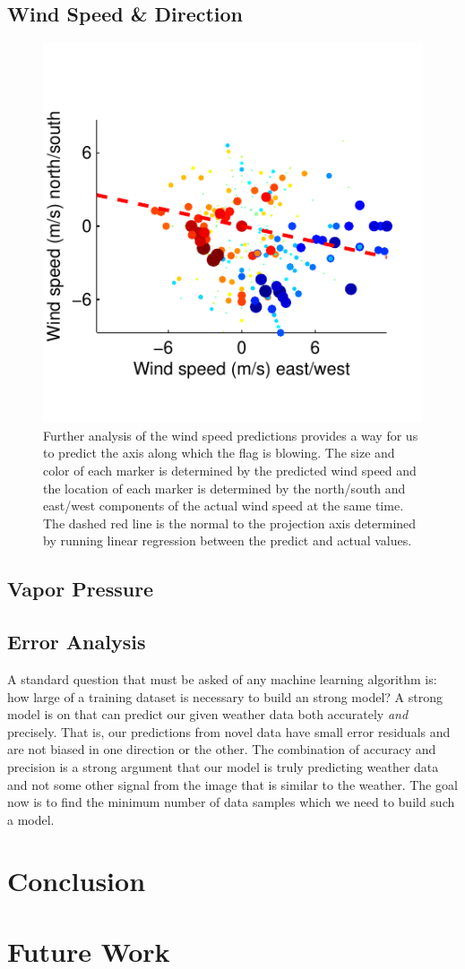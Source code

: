 \section{Wind Speed \& Direction}
\begin{figure}
	\centering
		\includegraphics{figures/windspeedscatter.pdf}
	\caption{Further analysis of the wind speed predictions provides a way for us to predict the axis along which the flag is blowing. The size and color of each marker is determined by the predicted wind speed and the location of each marker is determined by the north/south and east/west components of the actual wind speed at the same time. The dashed red line is the normal to the projection axis determined by running linear regression between the predict and actual values.}
	\label{fig:windspeedscatter}
\end{figure}

\section{Vapor Pressure}

\section{Error Analysis}
A standard question that must be asked of any machine learning algorithm is: how large of a training dataset is necessary to build an strong model? A strong model is on that can predict our given weather data both accurately \textit{and} precisely. That is, our predictions from novel data have small error residuals and are not biased in one direction or the other. The combination of accuracy and precision is a strong argument that our model is truly predicting weather data and not some other signal from the image that is similar to the weather. The goal now is to find the minimum number of data samples which we need to build such a model.


\chapter{Conclusion}
\label{cpt:conclusion}

\chapter{Future Work}
\label{cpt:future}
